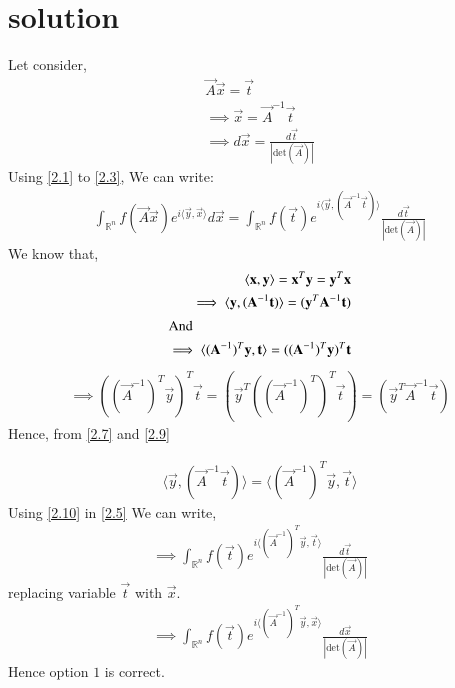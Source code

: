 \documentclass[journal,12pt,twocolumn]{IEEEtran}
\numberwithin{table}{section}
\begin{document}
	\section{solution}
Let consider,
\begin{align}
\vec{A}\vec{x} = \vec{t} \label{2.1}\\
\implies \vec{x} = \vec{A}^{-1}\vec{t} \label{2.2}\\
\implies d\vec{x} = \frac{d\vec{t}}{ \left | \text{det} (\vec{A}) \right |} \label{2.3}
\end{align}
Using  \eqref{2.1} to \eqref{2.3}, We can write: 
\begin{multline}
\int_{\mathbb{R}^n} f(\vec{A}\vec{x}) e^{i\langle \vec{y},\vec{x}\rangle} d\vec{x}  = \int_{\mathbb{R}^n} f(\vec{t}) e^{i \langle \vec{y},(\vec{A}^{-1}\vec{t})\rangle} \frac{d\vec{t}}{\left| \text{det}(\vec{A}) \right|} \label{2.5}
\end{multline}
We know that,
\begin{align}
\langle \vec{x},\vec{y} \rangle = \vec{x}^T\vec{y} = \vec{y}^T\vec{x}\\
\implies \langle \vec{y}, (\vec{A}^{-1}\vec{t})\rangle = (\vec{y}^T\vec{A}^{-1}\vec{t}) \label{2.7}\\
\intertext{And}
\implies  \langle (\vec{A}^{-1})^{T}\vec{y},\vec{t}\rangle = ((\vec{A}^{-1})^{T}\vec{y})^T\vec{t}
\end{align}
\begin{multline}
\implies   ((\vec{A}^{-1})^T\vec{y})^T\vec{t} = (\vec{y}^T((\vec{A}^{-1})^T)^T\vec{t}) = (\vec{y}^T\vec{A}^{-1}\vec{t}) \label{2.9}
\end{multline}
Hence, from \eqref{2.7} and \eqref{2.9}

\begin{align}
 \langle \vec{y}, (\vec{A}^{-1}\vec{t})\rangle  =  \langle(\vec{A}^{-1})^{T}\vec{y},\vec{t} \rangle    \label{2.10}
\end{align}
Using \eqref{2.10} in \eqref{2.5} We can write,
\begin{align}
\implies \int_{\mathbb{R}^n} f(\vec{t}) e^{i \langle (\vec{A}^{-1})^{T}\vec{y},\vec{t} \rangle} \frac{d\vec{t}}{\left| \text{det}(\vec{A}) \right|}
\end{align}
replacing variable  $\vec{t}$ with $\vec{x}$.
\begin{align}
\implies \int_{\mathbb{R}^n} f(\vec{t}) e^{i \langle (\vec{A}^{-1})^{T}\vec{y},\vec{x} \rangle} \frac{d\vec{x}}{\left| \text{det}(\vec{A}) \right|}
\end{align}
Hence option $1$ is correct.
\end{document}
